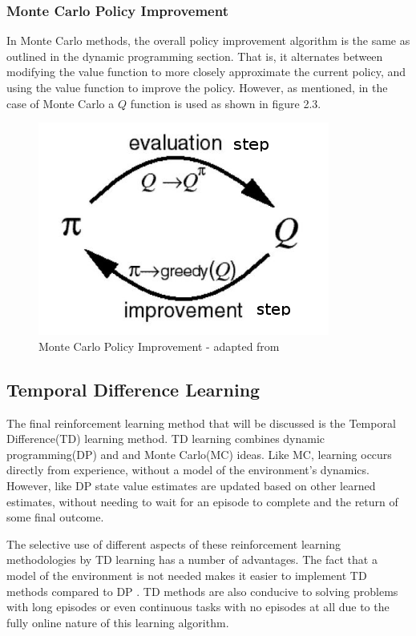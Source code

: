 \subsubsection{Monte Carlo Policy Improvement}
In Monte Carlo methods, the overall policy improvement algorithm is the same as outlined in the dynamic
programming section.
That is, it alternates between modifying the value function to more closely approximate the current policy,
and using the value function to improve the policy.
However, as mentioned, in the case of Monte Carlo a $Q$ function is used as shown in figure 2.3.
\begin{figure}[ht]
    \includegraphics[scale=.5]{images/MC_control.png}
    \caption{Monte Carlo Policy Improvement - adapted from\citep{lee2005mccontrol}}
\end{figure}

\subsection{Temporal Difference Learning}\label{subsec:td}
The final reinforcement learning method that will be discussed is the Temporal Difference(TD) learning method.
TD learning combines dynamic programming(DP) and and Monte Carlo(MC) ideas\citep{sutton1998reinforcement}.
Like MC, learning occurs directly from experience, without a model of the environment's dynamics.
However, like DP state value estimates are updated based on other learned estimates, without needing to wait for an
episode to complete and the return of some final outcome.

The selective use of different aspects of these reinforcement learning methodologies by TD learning has
a number of advantages.
The fact that a model of the environment is not needed makes it easier to implement TD methods
compared to DP .
TD methods are also conducive to solving problems with long episodes or even continuous tasks with no
episodes at all due to the fully online nature of this learning algorithm.

